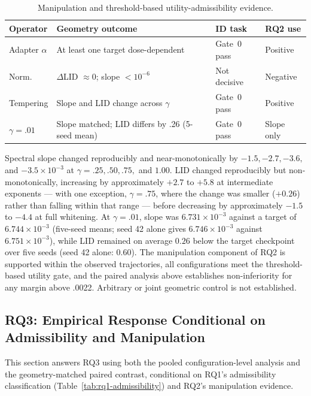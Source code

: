 \documentclass[11pt,a4paper]{article}
\begin{document}
\begin{table}[t]
\centering
\caption{Manipulation and threshold-based utility-admissibility evidence.}
\label{tab:rq2-manipulation}
\small
\begin{tabular}{p{2.2cm}p{6.0cm}p{3.0cm}p{2.2cm}}
\toprule
Operator & Geometry outcome & ID task & RQ2 use\\
\midrule
Adapter $\alpha$ & At least one target dose-dependent & Gate~0 pass & Positive\\
Norm. & $\Delta$LID $\approx0$; slope $<10^{-6}$ & Not decisive & Negative\\
Tempering & Slope and LID change across $\gamma$ & Gate~0 pass & Positive\\
$\gamma=.01$ & Slope matched; LID differs by .26 (5-seed mean) & Gate~0 pass & Slope only\\
\bottomrule
\end{tabular}
\end{table}

Spectral slope changed reproducibly and near-monotonically by $-1.5,-2.7,-3.6,$ and $-3.5\times10^{-3}$ at $\gamma=.25,.50,.75,$ and $1.00$. LID changed reproducibly but non-monotonically, increasing by approximately $+2.7$ to $+5.8$ at intermediate exponents --- with one exception, $\gamma=.75$, where the change was smaller ($+0.26$) rather than falling within that range --- before decreasing by approximately $-1.5$ to $-4.4$ at full whitening. At $\gamma=.01$, slope was $6.731\times10^{-3}$ against a target of $6.744\times10^{-3}$ (five-seed means; seed 42 alone gives $6.746\times10^{-3}$ against $6.751\times10^{-3}$), while LID remained on average $0.26$ below the target checkpoint over five seeds (seed 42 alone: $0.60$). The manipulation component of RQ2 is supported within the observed trajectories, all configurations meet the threshold-based utility gate, and the paired analysis above establishes non-inferiority for any margin above .0022. Arbitrary or joint geometric control is not established.

\subsection{RQ3: Empirical Response Conditional on Admissibility and Manipulation}
This section answers RQ3 using both the pooled configuration-level analysis and the geometry-matched paired contrast, conditional on RQ1's admissibility classification (Table~\ref{tab:rq1-admissibility}) and RQ2's manipulation evidence.
\end{document}
